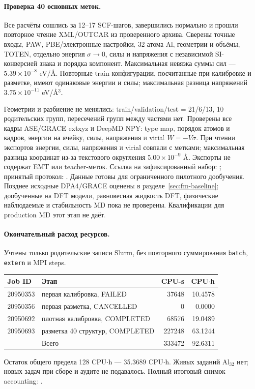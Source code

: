 \documentclass[11pt,a4paper]{article}
\begin{document}
\paragraph{Проверка 40 основных меток.}
Все расчёты сошлись за 12--17 SCF-шагов, завершились нормально и прошли
повторное чтение XML/OUTCAR из проверенного архива. Сверены точные входы,
PAW, PBE/электронные настройки, 32 атома Al, геометрии и объёмы,
TOTEN, отдельно энергия $\sigma\to0$, силы и напряжения с независимой
SI-конверсией знака и порядка компонент.
Максимальная невязка суммы сил --- $5.39\times10^{-8}$ eV/\AA.
Повторные train-конфигурации, посчитанные при калибровке и разметке,
имеют одинаковые энергии и силы; максимальная разница напряжений
$3.75\times10^{-11}$ eV/\AA$^3$.

Геометрии и разбиение не менялись: train/validation/test = 21/6/13,
10 родительских групп, пересечений групп между частями нет.
Проверены все кадры ASE/GRACE extxyz и DeepMD NPY: type map, порядок
атомов и кадров, энергии на ячейку, силы, напряжения и virial $W=-V\sigma$.
При чтении экспортов энергии, силы, напряжения и virial совпали с
метками; максимальная разница координат из-за текстового округления
$5.00\times10^{-9}$ \AA. Экспорты не содержат EMT или teacher-меток.
Ссылка на зафиксированный набор: ;
принятый протокол: .
Данные готовы для ограниченного пилотного дообучения. Позднее исходные
DPA4/GRACE оценены в разделе~\ref{sec:fm-baseline}; дообученные на DFT
модели, равновесная жидкость DFT, физические наблюдаемые и стабильность MD
пока не проверены. Квалификации для production MD этот этап не даёт.

\paragraph{Окончательный расход ресурсов.}
Учтены только родительские записи Slurm, без повторного суммирования
\texttt{batch}, \texttt{extern} и MPI steps.
\begin{center}
\begin{tabular}{llrr}
\toprule
Job ID & Этап & CPU-s & CPU$\cdot$h\\
\midrule
20950353 & первая калибровка, FAILED & 37648 & 10.4578\\
20950356 & первая разметка, CANCELLED & 0 & 0.0000\\
20950692 & плотная калибровка, COMPLETED & 68576 & 19.0489\\
20950693 & разметка 40 структур, COMPLETED & 227248 & 63.1244\\
\midrule
 & Всего & 333472 & 92.6311\\
\bottomrule
\end{tabular}
\end{center}
Остаток общего предела 128 CPU$\cdot$h --- 35.3689 CPU$\cdot$h.
Живых заданий Al$_{32}$ нет; новых задач при сборе и аудите не подавалось.
Полный итоговый снимок accounting:
.
\end{document}
